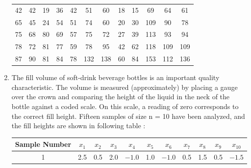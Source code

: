 \documentclass[11pt, a4paper]{article}
\begin{document}
\begin{enumerate}
	\begin{table}[h]
	\def\arraystretch{1.5}
	
	\begin{center}
	\begin{tabular}{|cccccccccccc|}
	
	\hline
	
	42 & 42 & 19 & 36 & 42 & 51 & 60 & 18 & 15 & 69 & 64 & 61 \\
	
	65 & 45 & 24 & 54 & 51 & 74 & 60 & 20 & 30 & 109 & 90 & 78 \\
	
	75 & 68 & 80 & 69 & 57 & 75 & 72 & 27 & 39 & 113 & 93 & 94 \\
	
	78 & 72 & 81 & 77 & 59 & 78 & 95 & 42 & 62 & 118 & 109 & 109 \\
	
	87 & 90 & 81 & 84 & 78 & 132 & 138 & 60 & 84 & 153 & 112 & 136 \\
	
	\hline
	
	\end{tabular}
	\end{center}
	
	\end{table}
	
	
	
	
	
	
	\item The fill volume of soft-drink beverage bottles is an important quality characteristic. The volume is measured (approximately) by placing a gauge over the crown and comparing the height of the liquid in the neck of the bottle against a coded scale. On this scale, a reading of zero corresponds to the correct fill height. Fifteen samples of size n = 10 have been analyzed, and the fill heights are shown in following table :
	
	\begin{table}[h]
	\def\arraystretch{1.5}
	
	\begin{center}
	\begin{tabular}{|c||cccccccccc|}
	
	\hline
	
	Sample Number & $x_1$ & $x_2$ & $x_3$ & $x_4$ & $x_5$ & $x_6$ & $x_7$ & $x_8$ & $x_9$ & $x_{10}$ \\
	
	\hline
	
	1 & 2.5 & 0.5 & 2.0 & $-1.0$ & 1.0 & $-1.0$ & 0.5 & 1.5 & 0.5 & $-1.5$ \\
	

\end{tabular}
\end{center}
\end{table}
\end{enumerate}
\end{document}
